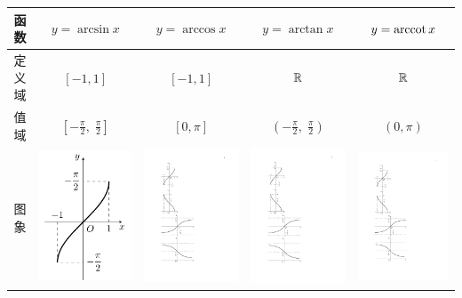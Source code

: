 \begin{landscape}
\begin{tabular}{c|cccc}
\hline
函数 & $y=\arcsin x$& $y=\arccos x$& $y=\arctan x$& $y={\rm arccot\,} x$\\ \hline
定义域&$[-1,1]$&$[-1,1]$&$\mathbb{R}$&$\mathbb{R}$\\ 
值域 &$\left[-\frac{\pi}{2},\; \frac{\pi}{2}\right]$ &$[0,\pi]$   &$\left(-\frac{\pi}{2},\; \frac{\pi}{2}\right)$& $(0,\pi)$\\ 
图象&\includegraphics[width=.2\textwidth]{fig/fig1.pdf} &\includegraphics[width=.2\textwidth]{fig/fig2.pdf}&\includegraphics[width=.3\textwidth]{fig/fig3.pdf}&\includegraphics[width=.3\textwidth]{fig/fig4.pdf}\\ 

\end{tabular}
\end{landscape}

